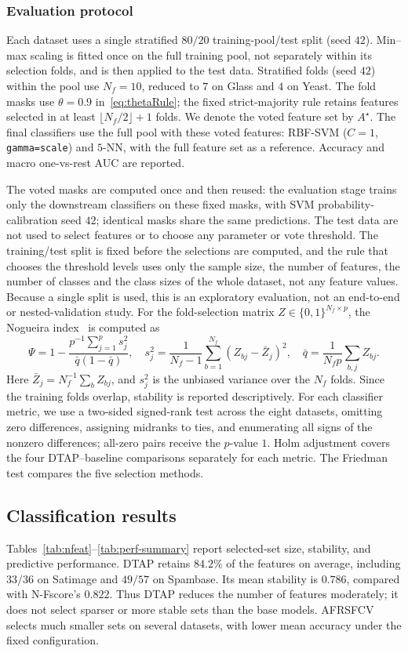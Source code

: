 \documentclass[]{interact}
\theoremstyle{plain}
\theoremstyle{definition}
\theoremstyle{remark}
\begin{document}
\subsubsection{Evaluation protocol}\label{sssec:protocol}
Each dataset uses a single stratified $80/20$ training-pool/test split
(seed $42$). Min--max scaling is fitted once on the full training pool, not
separately within its selection folds, and is then applied to the test data.
Stratified folds (seed $42$) within the pool use $N_f=10$, reduced to $7$ on Glass
and $4$ on Yeast. The fold masks use $\theta=0.9$ in~\eqref{eq:thetaRule};
the fixed strict-majority rule retains features selected in at least
$\lfloor N_f/2\rfloor+1$ folds. We denote the voted feature set by $A^\star$. The final classifiers use the full pool with these
voted features: RBF-SVM ($C=1$, \texttt{gamma=scale}) and $5$-NN, with the full
feature set as a reference. Accuracy and macro one-vs-rest AUC are reported.

The voted masks are computed once and then reused: the evaluation stage trains
only the downstream classifiers on these fixed masks, with SVM probability-calibration
seed $42$; identical masks share the same predictions. The test data are not used to select features or to choose any parameter or vote threshold.
The training/test split is fixed before the selections are computed, and the rule that chooses
the threshold levels uses only the sample size, the number of features, the number of classes
and the class sizes of the whole dataset, not any feature values. Because a single split is
used, this is an exploratory evaluation, not an end-to-end or nested-validation study.
For the fold-selection matrix $Z\in\{0,1\}^{N_f\times p}$, the Nogueira index~\citep{nogueira2018}
is computed as
\[
\Psi=1-\frac{p^{-1}\sum_{j=1}^{p}s_j^2}{\bar q(1-\bar q)},\quad
s_j^2=\frac{1}{N_f-1}\sum_{b=1}^{N_f}(Z_{bj}-\bar Z_j)^2,\quad
\bar q=\frac{1}{N_f p}\sum_{b,j}Z_{bj}.
\]
Here $\bar Z_j=N_f^{-1}\sum_b Z_{bj}$, and $s_j^2$ is the unbiased variance over the $N_f$
folds.
Since the training folds overlap, stability is reported descriptively.
For each classifier metric, we use a two-sided signed-rank test across the
eight datasets, omitting zero differences, assigning midranks to ties, and
enumerating all signs of the nonzero differences; all-zero pairs receive the $p$-value $1$.
Holm adjustment covers the four DTAP--baseline comparisons separately for
each metric. The Friedman test compares the five selection methods.

\subsection{Classification results}\label{ssec:results}
Tables~\ref{tab:nfeat}--\ref{tab:perf-summary} report selected-set size,
stability, and predictive performance. DTAP retains $84.2\%$ of the features
on average, including $33/36$ on Satimage and $49/57$ on Spambase.
Its mean stability is $0.786$, compared with N-Fscore's $0.822$.
Thus DTAP reduces the number of features moderately; it does not select sparser or more
stable sets than the base models. AFRSFCV selects much smaller sets on several datasets,
with lower mean accuracy under the fixed configuration.
\end{document}
